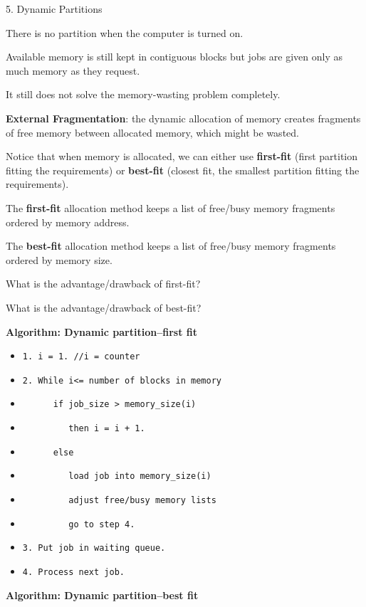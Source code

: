 \begin{slide}{ 5. Dynamic Partitions}
\item There is no partition when the computer is turned on.
\item Available memory is still kept in contiguous blocks but jobs
are given only as much memory as they request.
\item It still does not solve the memory-wasting problem completely.
\newpage
\item {\bf External Fragmentation}: the dynamic allocation of memory creates
fragments of free memory between allocated memory, which might be wasted.
\item Notice that when memory is allocated, we can either use
{\bf first-fit} (first partition fitting the requirements) or {\bf best-fit}
(closest fit, the smallest partition fitting the requirements).
\item The {\bf first-fit} allocation method keeps a list of free/busy memory
fragments ordered by memory address.
\item The {\bf best-fit} allocation method keeps a list of free/busy memory
fragments ordered by memory size.
\item What is the advantage/drawback of first-fit?
\vspace{2cm}
\item What is the advantage/drawback of best-fit?
\newpage
\item {\bf Algorithm: Dynamic partition--first fit}
 \begin{itemize}
 \item {\tt 1. i = 1. //i = counter}
 \item {\tt 2. While i<= number of blocks in memory}
 \item {\tt ~~~~~~if job\_size > memory\_size(i)}
 \item {\tt ~~~~~~~~~then i = i + 1.}
 \item {\tt ~~~~~~else}
 \item {\tt ~~~~~~~~~load job into memory\_size(i)}
 \item {\tt ~~~~~~~~~adjust free/busy memory lists}
 \item {\tt ~~~~~~~~~go to step 4.}
 \item {\tt 3. Put job in waiting queue.}
 \item {\tt 4. Process next job.}
 \end{itemize}
\newpage
\item {\bf Algorithm: Dynamic partition--best fit}

\end{slide}
